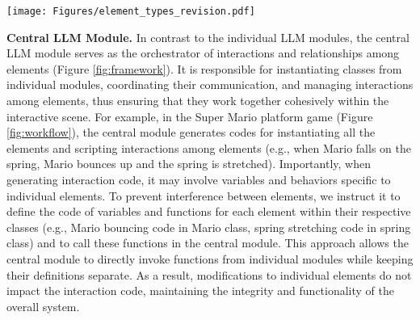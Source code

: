 \begin{figure*}[t]
\texttt{[image: Figures/element\_types\_revision.pdf]}
  \caption{
  }
  \label{fig:elemen_type}
\end{figure*}


\textbf{Central LLM Module.}
In contrast to the individual LLM modules, the central LLM module serves as the orchestrator of interactions and relationships {among} %
elements (Figure \ref{fig:framework}). It is responsible for instantiating classes from individual modules, coordinating their communication, {and} managing interactions among elements, {thus} ensuring that they work together cohesively within the interactive scene. For example, in the Super Mario platform game  (Figure \ref{fig:workflow}), the central module generates codes for instantiating all the elements and scripting interactions among elements (e.g., when Mario falls on the spring, Mario bounces up and the spring is stretched). Importantly, when generating interaction code, it may involve variables and behaviors specific to individual elements. To prevent interference between elements, we instruct it to 
define the code of variables and functions for each element %
within their respective classes {(e.g., Mario bouncing code in Mario class, spring stretching code in spring class)} and to call these functions in the central module. This approach allows the central module to directly invoke functions from individual modules while keeping their definitions separate. As a result, modifications to individual elements do not impact the interaction code, maintaining the integrity and functionality of the overall system.




